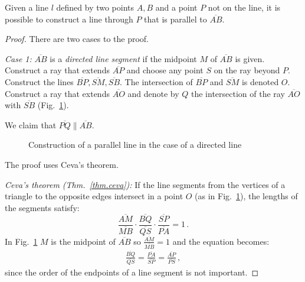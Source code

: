 \begin{theorem}\label{thm.straight-parallel}
Given a line $l$ defined by two points $A,B$ and a point $P$ not on the line, it is possible to construct a line through $P$ that is parallel to $\overline{AB}$.
\end{theorem}

\begin{proof}

There are two cases to the proof.

\textit{Case 1:}
$\overline{AB}$ is a \emph{directed line segment} if the midpoint $M$ of $\overline{AB}$ is given.  Construct a ray that extends $\overline{AP}$ and choose any point $S$ on the ray beyond $P$. Construct the lines $\overline{BP}, \overline{SM}, \overline{SB}$. The intersection of $\overline{BP}$ and $\overline{SM}$ is denoted $O$. Construct a ray that extends $\overline{AO}$ and denote by $Q$ the intersection of the ray $\overline{AO}$ with $\overline{SB}$ (Fig.~\ref{f.se-parallel-directed}).

We claim that $\overline{PQ}\parallel \overline{AB}$. 

\begin{figure}[ht]
\begin{center}
\end{center}
\caption{Construction of a parallel line in the case of a directed line}\label{f.se-parallel-directed}
\end{figure}

\newpage
The proof uses Ceva's theorem.

\textit{Ceva's theorem  (Thm.~\ref{thm.ceva}):} If the line segments from the vertices of a triangle to the opposite edges intersect in a point $O$ (as in Fig.~\ref{f.se-parallel-directed}), the lengths of the segments satisfy:
\[
\frac{\overline{AM}}{\overline{MB}}\cdot\frac{\overline{BQ}}{\overline{QS}}\cdot\frac{\overline{SP}}{\overline{PA}} = 1\,.
\]
In Fig.~\ref{f.se-parallel-directed} $M$ is the midpoint of $\overline{AB}$ so $\displaystyle\frac{\overline{AM}}{\overline{MB}}=1$ and the equation becomes:
\begin{align}
\frac{\overline{BQ}}{\overline{QS}}=\frac{\overline{PA}}{\overline{SP}}=\frac{\overline{AP}}{\overline{PS}}\,,\label{eq.ceva}
\end{align}
since the order of the endpoints of a line segment is not important.


\end{proof}
